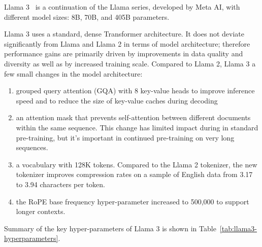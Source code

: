 Llama 3~\cite{llama3} is a continuation of the Llama series, developed by Meta AI, with different model sizes: 8B, 70B, and 405B parameters.

Llama 3 uses a standard, dense Transformer architecture.
It does not deviate significantly from Llama and Llama 2 in terms of model architecture; therefore performance gains are primarily driven by improvements in data quality and diversity as well as by increased training scale.
Compared to Llama 2, Llama 3 a few small changes in the model architecture:
\begin{enumerate}
	\item grouped query attention (GQA) with 8 key-value heads to improve inference speed and to reduce the size of key-value caches during decoding
	\item an attention mask that prevents self-attention between different documents within the same sequence.
	      This change has limited impact during in standard pre-training, but it's important in continued pre-training on very long sequences.
	\item a vocabulary with 128K tokens.
	      Compared to the Llama 2 tokenizer, the new tokenizer improves compression rates on a sample of English data from 3.17 to 3.94 characters per token.
	\item the RoPE base frequency hyper-parameter increased to 500,000 to support longer contexts.
\end{enumerate}
Summary of the key hyper-parameters of Llama 3 is shown in Table~\ref{tab:llama3-hyperparameters}.

